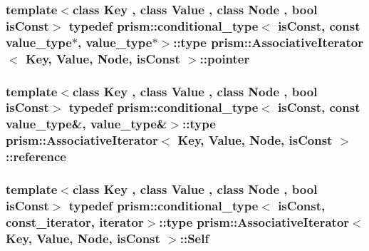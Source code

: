 \subsubsection[{\texorpdfstring{pointer}{pointer}}]{\setlength{\rightskip}{0pt plus 5cm}template$<$class Key , class Value , class Node , bool is\+Const$>$ typedef {\bf prism\+::conditional\+\_\+type}$<$ is\+Const, const {\bf value\+\_\+type}$\ast$, {\bf value\+\_\+type}$\ast$$>$\+::type {\bf prism\+::\+Associative\+Iterator}$<$ Key, Value, Node, is\+Const $>$\+::{\bf pointer}}\hypertarget{structprism_1_1_associative_iterator_a50b40598e0da0364f809450010172dd2}{}\label{structprism_1_1_associative_iterator_a50b40598e0da0364f809450010172dd2}
\subsubsection[{\texorpdfstring{reference}{reference}}]{\setlength{\rightskip}{0pt plus 5cm}template$<$class Key , class Value , class Node , bool is\+Const$>$ typedef {\bf prism\+::conditional\+\_\+type}$<$ is\+Const, const {\bf value\+\_\+type}\&, {\bf value\+\_\+type}\&$>$\+::type {\bf prism\+::\+Associative\+Iterator}$<$ Key, Value, Node, is\+Const $>$\+::{\bf reference}}\hypertarget{structprism_1_1_associative_iterator_a3e7953b18f39af18e7cac9b95c9709e7}{}\label{structprism_1_1_associative_iterator_a3e7953b18f39af18e7cac9b95c9709e7}
\subsubsection[{\texorpdfstring{Self}{Self}}]{\setlength{\rightskip}{0pt plus 5cm}template$<$class Key , class Value , class Node , bool is\+Const$>$ typedef {\bf prism\+::conditional\+\_\+type}$<$ is\+Const, {\bf const\+\_\+iterator}, {\bf iterator}$>$\+::type {\bf prism\+::\+Associative\+Iterator}$<$ Key, Value, Node, is\+Const $>$\+::{\bf Self}}\hypertarget{structprism_1_1_associative_iterator_acec023aedf7a8097250179b1de84d78d}{}\label{structprism_1_1_associative_iterator_acec023aedf7a8097250179b1de84d78d}

